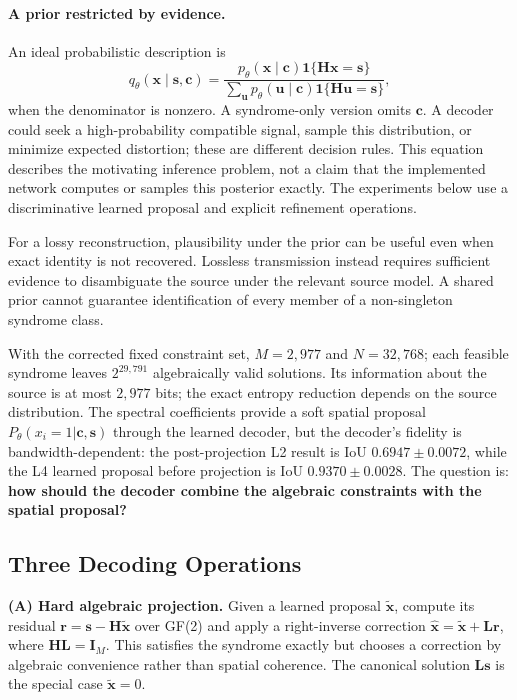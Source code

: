 \documentclass[11pt,a4paper]{article}
\begin{document}
\paragraph{A prior restricted by evidence.}
An ideal probabilistic description is
\[
 q_\theta(\mathbf{x}\mid\mathbf{s},\mathbf{c})=
 \frac{p_\theta(\mathbf{x}\mid\mathbf{c})
 \mathbf{1}\{\mathbf{H}\mathbf{x}=\mathbf{s}\}}
 {\sum_{\mathbf{u}}p_\theta(\mathbf{u}\mid\mathbf{c})
 \mathbf{1}\{\mathbf{H}\mathbf{u}=\mathbf{s}\}},
\]
when the denominator is nonzero. A syndrome-only version omits
$\mathbf{c}$. A decoder could seek a high-probability compatible signal,
sample this distribution, or minimize expected distortion; these are
different decision rules. This equation describes the motivating inference
problem, not a claim that the implemented network computes or samples this
posterior exactly. The experiments below use a discriminative learned
proposal and explicit refinement operations.

For a lossy reconstruction, plausibility under the prior can be useful
even when exact identity is not recovered. Lossless transmission instead
requires sufficient evidence to disambiguate the source under the relevant
source model. A shared prior cannot guarantee identification of every
member of a non-singleton syndrome class.

With the corrected fixed constraint set, $M = 2{,}977$ and
$N = 32{,}768$; each feasible syndrome leaves $2^{29{,}791}$ algebraically valid
solutions. Its information about the source is at most $2{,}977$ bits;
the exact entropy reduction depends on the source distribution.
The spectral coefficients provide a soft spatial proposal
$P_\theta(x_i = 1 | \mathbf{c},\mathbf{s})$ through the learned decoder, but
the decoder's fidelity is bandwidth-dependent: the post-projection L2 result
is IoU $0.6947\pm0.0072$, while the L4 learned proposal before projection is
IoU $0.9370\pm0.0028$.
The question is: \textbf{how should the decoder combine the algebraic
constraints with the spatial proposal?}

\subsection{Three Decoding Operations}

\textbf{(A) Hard algebraic projection.}
Given a learned proposal $\tilde{\mathbf{x}}$, compute its residual
$\mathbf{r}=\mathbf{s}-\mathbf{H}\tilde{\mathbf{x}}$ over GF(2) and apply a
right-inverse correction
$\hat{\mathbf{x}}=\tilde{\mathbf{x}}+\mathbf{L}\mathbf{r}$, where
$\mathbf{H}\mathbf{L}=\mathbf{I}_M$. This satisfies the syndrome exactly but
chooses a correction by algebraic convenience rather than spatial coherence.
The canonical solution $\mathbf{L}\mathbf{s}$ is the special case
$\tilde{\mathbf{x}}=0$.
\end{document}
